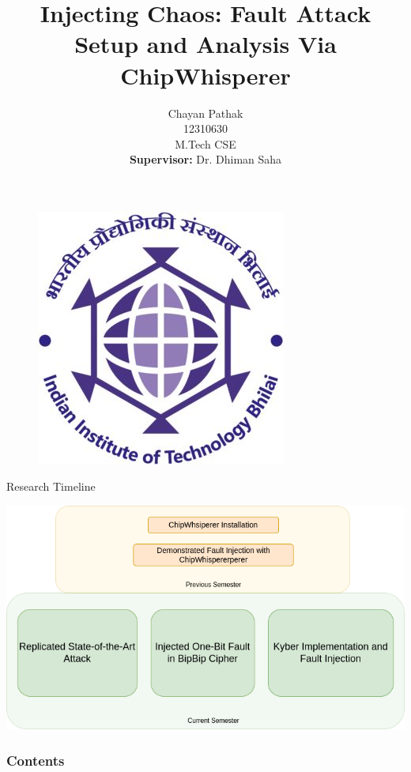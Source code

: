 \documentclass{beamer}
\author[Chayan Pathak,M.Tech,CSE]{Chayan Pathak\\12310630\\M.Tech CSE \\ \textbf{Supervisor:} Dr. Dhiman Saha}
\title[Thesis Defence Seminar]{Injecting Chaos: Fault Attack Setup and Analysis Via ChipWhisperer}
\date[10/06/2025]
\newenvironment{tres important}[2][]{
	\setkeys{EmphEqEnv}{#2}
	\setkeys{EmphEqOpt}{box={\setlength{\fboxsep}{10pt}\fcolorbox{myNewColorA}{white}},#1}
	\EmphEqMainEnv}
{\endEmphEqMainEnv}
\begin{document}

\begin{frame}
        \begin{figure}
	\centering
	\includegraphics[width=0.2\linewidth]{images/iitbhilailogo.png}
	\label{fig:iitlogo}
        \end{figure}
    
            \titlepage
            
        \end{frame}
        \begin{frame}{Research Timeline}
          \begin{center}
              \includegraphics[width=1\linewidth]{images/mtech.drawio.png}
              
          \end{center}
        \end{frame}
        \begin{frame}
            \frametitle{Contents}
            \tableofcontents
        \end{frame}

\end{document}
